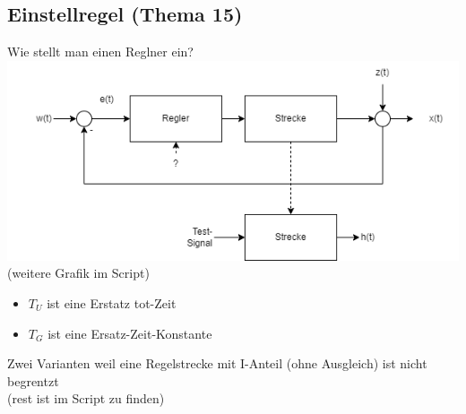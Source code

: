 \documentclass{article}
\begin{document}
\subsection*{Einstellregel (Thema 15)}
Wie stellt man einen Reglner ein? \\
\includegraphics[width=\textwidth]{2024_11_21_Wie_stelle_ich_einen_Regler_ein.png}
(weitere Grafik im Script)\\
\begin{itemize}
	\item $T_U$ ist eine Erstatz tot-Zeit
	\item $T_G$ ist eine Ersatz-Zeit-Konstante
\end{itemize}
Zwei Varianten weil eine Regelstrecke mit I-Anteil (ohne Ausgleich) ist nicht begrentzt \\
(rest ist im Script zu finden)
\end{document}
